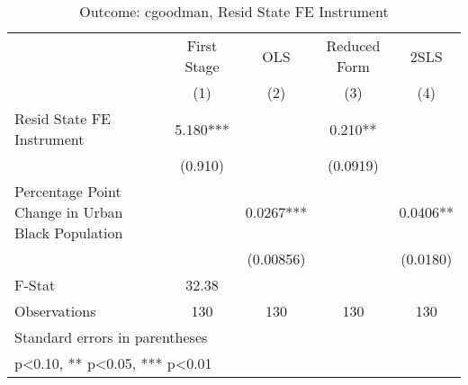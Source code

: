\begin{table}[htbp]\centering
\def\sym#1{\ifmmode^{#1}\else\(^{#1}\)\fi}
\caption{Outcome: cgoodman, Resid State FE Instrument}
\begin{tabular}{l*{4}{c}}
\toprule
                    & First Stage   &         OLS   &Reduced Form   &        2SLS   \\
                    &\multicolumn{1}{c}{(1)}   &\multicolumn{1}{c}{(2)}   &\multicolumn{1}{c}{(3)}   &\multicolumn{1}{c}{(4)}   \\
\midrule
Resid State FE Instrument&       5.180***&               &       0.210** &               \\
                    &     (0.910)   &               &    (0.0919)   &               \\
\addlinespace
Percentage Point Change in Urban Black Population&               &      0.0267***&               &      0.0406** \\
                    &               &   (0.00856)   &               &    (0.0180)   \\
\midrule
F-Stat              &       32.38   &               &               &               \\
Observations        &         130   &         130   &         130   &         130   \\
\bottomrule
\multicolumn{5}{l}{\footnotesize Standard errors in parentheses}\\
\multicolumn{5}{l}{\footnotesize * p<0.10, ** p<0.05, *** p<0.01}\\
\end{tabular}
\end{table}
